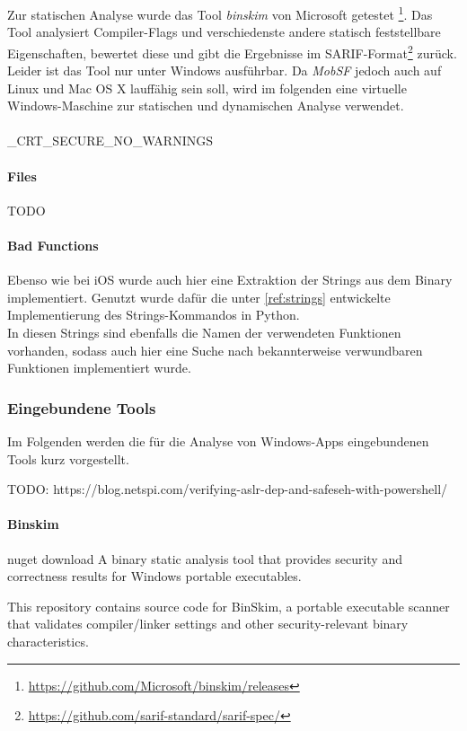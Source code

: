 Zur statischen Analyse wurde das Tool \textit{binskim} von Microsoft getestet \footnote{\url{https://github.com/Microsoft/binskim/releases}}. Das Tool analysiert Compiler-Flags und verschiedenste andere statisch feststellbare Eigenschaften, bewertet diese und gibt die Ergebnisse im SARIF-Format\footnote{\url{https://github.com/sarif-standard/sarif-spec/}} zurück. Leider ist das Tool nur unter Windows ausführbar. Da \textit{MobSF} jedoch auch auf Linux und Mac OS X lauffähig sein soll, wird im folgenden eine virtuelle Windows-Maschine zur statischen und dynamischen Analyse verwendet.
\\\\
\_CRT\_SECURE\_NO\_WARNINGS

\paragraph{Files}
TODO

\paragraph{Bad Functions}
Ebenso wie bei iOS wurde auch hier eine Extraktion der Strings aus dem Binary implementiert. Genutzt wurde dafür die unter \ref{ref:strings} entwickelte Implementierung des Strings-Kommandos in Python.\\

In diesen Strings sind ebenfalls die Namen der verwendeten Funktionen vorhanden, sodass auch hier eine Suche nach bekannterweise verwundbaren Funktionen implementiert wurde.

\subsubsection{Eingebundene Tools}\label{ref:WeitMobEingTools}
Im Folgenden werden die für die Analyse von Windows-Apps eingebundenen Tools kurz vorgestellt.

TODO: https://blog.netspi.com/verifying-aslr-dep-and-safeseh-with-powershell/

\paragraph{Binskim}
nuget download
A binary static analysis tool that provides security and correctness results for Windows portable executables. 

This repository contains source code for BinSkim, a portable executable scanner that validates compiler/linker settings and other security-relevant binary characteristics.

